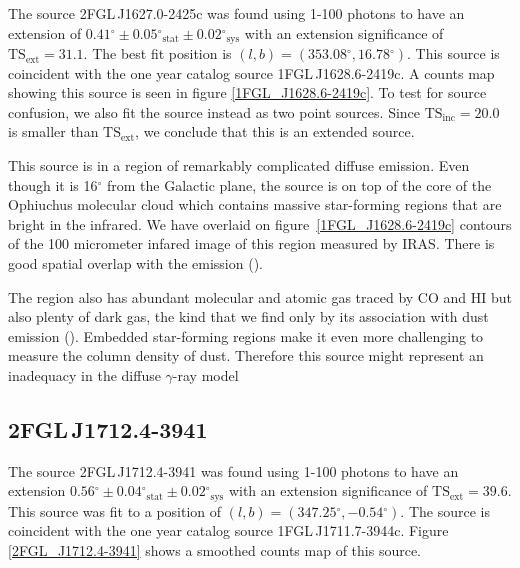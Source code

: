 \documentclass[12pt,preprint]{aastex}
\newcommand{\gev}{\text{GeV}\xspace}
\newcommand{\tsext}{{\ensuremath{\text{TS}_{\text{ext}}}}\xspace}
\newcommand{\tsinc}{\ensuremath{\text{TS}_{\text{inc}}}\xspace}
\newcommand{\sys}{\text{sys}\xspace}
\newcommand{\stat}{\text{stat}\xspace}
\renewcommand{\deg}{\ensuremath{^\circ}\xspace}
\begin{document}

The source 2FGL\,J1627.0-2425c was found 
using 1-100 \gev photons to have an 
extension of $0.41\deg\pm0.05\deg_\stat\pm0.02\deg_\sys$ 
with an extension significance of $\tsext=31.1$. 
The best fit position is $(l,b)=(353.08\deg, 16.78\deg)$.
This source is coincident with the one year catalog source 1FGL\,J1628.6-2419c.
A counts map showing this source is
seen in figure \ref{1FGL_J1628.6-2419c}.  To test for source confusion,
we also fit the source instead as two point sources. Since $\tsinc=20.0$
is smaller than \tsext, we conclude that this is an extended source.

This source is in a region of remarkably complicated diffuse emission.
Even though it is 16\deg from the Galactic plane, the source is on top
of the core of the Ophiuchus molecular cloud which contains massive
star-forming regions that are bright in the infrared.  We have overlaid
on figure~\ref{1FGL_J1628.6-2419c} contours of the 100 micrometer infared
image of this region measured by IRAS. There is good spatial overlap
with the \gev emission (\cite{iras_rho_ophiuci}).

The region also has abundant molecular and atomic gas traced by CO
and HI but also plenty of dark gas, the kind that we find only by its
association with dust emission (\cite{isabelle_dark_gass}). Embedded
star-forming regions make it even more challenging to measure the column
density of dust.  Therefore this source might represent an inadequacy
in the diffuse $\gamma$-ray model

\subsection{2FGL\,J1712.4-3941}
\label{section_2FGL_J1712.4-3941}


The source 2FGL\,J1712.4-3941 was found using 1-100 \gev
photons to have an extension $0.56\deg\pm0.04\deg_\stat\pm0.02\deg_\sys$
with an extension significance of $\tsext=39.6$.  This source was
fit to a position of $(l,b)=(347.25\deg,-0.54\deg)$.  The source
is coincident with the one year catalog source 1FGL\,J1711.7-3944c.
Figure \ref{2FGL_J1712.4-3941} shows a smoothed counts map of this source.
\end{document}

